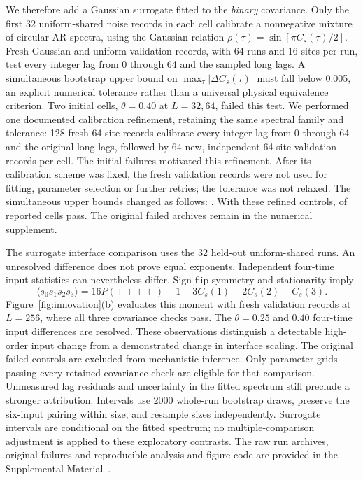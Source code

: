 We therefore add a Gaussian surrogate fitted to the \emph{binary} covariance.
Only the first 32 uniform-shared noise records in each cell calibrate a
nonnegative mixture of circular AR spectra, using the Gaussian relation
$\rho(\tau)=\sin[\pi C_s(\tau)/2]$. Fresh Gaussian and uniform validation
records, with 64 runs and 16 sites per run, test every integer lag from 0
through 64 and the sampled long lags. A simultaneous bootstrap upper bound
on $\max_\tau|\Delta C_s(\tau)|$ must fall below 0.005, an explicit numerical
tolerance rather than a universal physical equivalence criterion.
Two initial cells, $\theta=0.40$ at $L=32,64$, failed this test.
We performed one documented calibration refinement, retaining the same
spectral family and tolerance: 128 fresh 64-site records calibrate every
integer lag from 0 through 64 and the original long lags, followed by
64 new, independent 64-site validation records per cell.
The initial failures motivated this refinement. After its calibration scheme
was fixed, the fresh validation records were not used for fitting, parameter
selection or further retries; the tolerance was not relaxed.
The simultaneous upper bounds changed as follows:
\InnovationRefinementBounds{}.
\InnovationLargeValidationNotice{}
With these refined controls, \InnovationBinaryPass{} of \InnovationCells{}
reported cells pass. The original failed archives remain in the numerical
supplement. \InnovationFailedInferenceNotice{}

The surrogate interface comparison uses the 32 held-out uniform-shared
runs. \InnovationSurrogateFinding{}
An unresolved difference does not prove equal exponents.
Independent four-time input statistics can nevertheless differ.
Sign-flip symmetry and stationarity imply
\begin{equation}
 \langle s_0s_1s_2s_3\rangle
 =16P(++++)-1-3C_s(1)-2C_s(2)-C_s(3).
 \label{eq:foursign}
\end{equation}
Figure~\ref{fig:innovation}(b) evaluates this moment with fresh validation
records at $L=256$, where all three covariance checks pass. The
$\theta=0.25$ and $0.40$ four-time input differences are resolved.
These observations distinguish a detectable high-order input change from a
demonstrated change in interface scaling. The original failed controls
are excluded from mechanistic inference. Only parameter grids passing
every retained covariance check are eligible for that comparison.
Unmeasured lag residuals and uncertainty in the fitted spectrum still
preclude a stronger attribution. Intervals use 2000 whole-run bootstrap draws,
preserve the six-input pairing within size, and resample sizes independently.
Surrogate intervals are conditional on the fitted spectrum; no
multiple-comparison adjustment is applied to these exploratory contrasts.
The raw run archives, original failures and reproducible analysis and
figure code are provided in the Supplemental Material~\cite{SupplementalData}.

